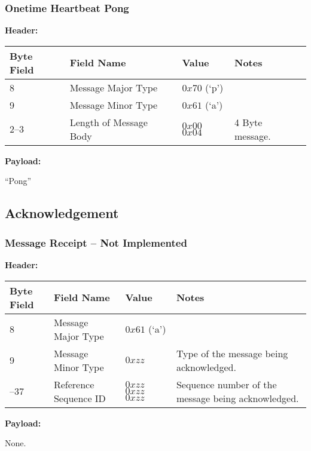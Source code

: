 \subsubsection{Onetime Heartbeat Pong}
\textbf{Header:}
\begin{center}
    \begin{tabular}{ | l | l | p{3cm} | p{5cm} |}
    \hline
    \hline
    \textbf{Byte Field} & \textbf{Field Name} & \textbf{Value} & \textbf{Notes} \\ \hline \hline
    8 & Message Major Type & $0x70$ (`p') &  \\    \hline
    9 & Message Minor Type & $0x61$ (`a') &  \\    \hline
    2--3 & Length of Message Body & $0x00$ $0x04$ & 4 Byte message. \\ \hline
    \end{tabular}
\end{center}
\noindent
\textbf{Payload:}
\begin{framed}
``Pong''
\end{framed}


\subsection{Acknowledgement}
\subsubsection{Message Receipt -- Not Implemented}
\textbf{Header:}
\begin{center}
    \begin{tabular}{ | l | l | p{3cm} | p{5cm} |}
    \hline
    \hline
    \textbf{Byte Field} & \textbf{Field Name} & \textbf{Value} & \textbf{Notes} \\ \hline \hline
    8 & Message Major Type & $0x61$ (`a') &  \\    \hline
    9 & Message Minor Type & $0xzz$ & Type of the message being acknowledged. \\    \hline
    \zerolenmessage
    35--37 & Reference Sequence ID & $0xzz$ $0xzz$ $0xzz$ & Sequence number of the message being acknowledged.\\ \hline

    \end{tabular}
\end{center}
\noindent
\textbf{Payload:}
\begin{framed}
None.
\end{framed}

